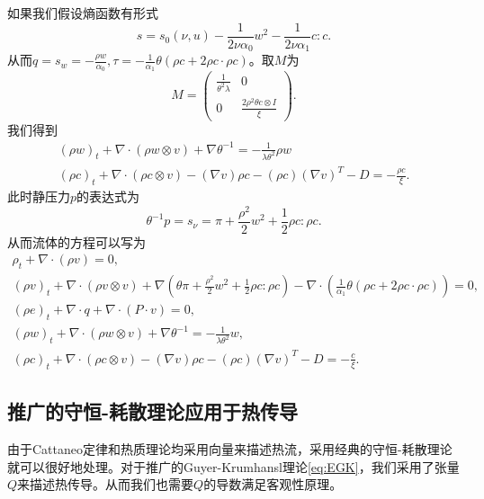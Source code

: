 \documentclass{article}
\begin{document}
	如果我们假设熵函数有形式
	\begin{equation*}
			s = s_0(\nu,u)  - \frac{1}{2 \nu \alpha_0} w^2 - \frac{1}{2  \nu \alpha_1} c:c.
	\end{equation*}
	从而$q=s_w=-\frac{\rho w}{\alpha_0},\tau = - \frac{1}{\alpha_1}  \theta (\rho c + 2 \rho c \cdot \rho c)$。取$M$为
	\begin{equation*}
		M = \left( \begin{array}{ccc} 
			\frac{1}{\theta^2 \lambda} & 0 \\
			0 &  \frac{2 \rho^2 \theta c \otimes I}{\xi}   
		\end{array} \right).
	\end{equation*}
	我们得到
\begin{eqnarray*}
			(\rho w)_t +  \nabla \cdot (\rho w \otimes v)  + \nabla \theta^{-1} = -\frac{1}{\lambda \theta^2}  \rho w \\
			(\rho c)_t +  \nabla \cdot (\rho c \otimes v) - (\nabla v) \rho c - (\rho c) (\nabla v)^T - D = - \frac{\rho c}{\xi} .
\end{eqnarray*}
此时静压力$p$的表达式为
\begin{equation*}
			\theta^{-1} p = s_\nu = \pi +\frac{\rho^2}{2} w^2 + \frac{1}{2} \rho c: \rho c.
\end{equation*}
从而流体的方程可以写为
\begin{subequations}
		\begin{align*}
			\rho_t + \nabla \cdot (\rho v) = 0 ,\\
			(\rho v)_t + \nabla \cdot (\rho v \otimes v) + \nabla (\theta\pi +\frac{\rho^2}{2} w^2 + \frac{1}{2} \rho c: \rho c)  - \nabla \cdot ( \frac{1}{\alpha_1}  \theta (\rho c + 2 \rho c \cdot \rho c)) =0 ,\\
			(\rho e)_t + \nabla \cdot q + \nabla \cdot (P \cdot v) = 0, \\
			(\rho w)_t + \nabla \cdot (\rho w \otimes v) + \nabla \theta^{-1} = -\frac{1}{\lambda \theta^2} w, \\
			(\rho c)_t +  \nabla \cdot (\rho c \otimes v) - (\nabla v) \rho c - (\rho c) (\nabla v)^T - D = - \frac{c}{\xi} .
		\end{align*}
	\end{subequations}


	\subsection{推广的守恒-耗散理论应用于热传导}
	由于Cattaneo定律和热质理论均采用向量来描述热流，采用经典的守恒-耗散理论就可以很好地处理。对于推广的Guyer-Krumhansl理论\eqref{eq:EGK}，我们采用了张量$Q$来描述热传导。从而我们也需要$Q$的导数满足客观性原理。
\end{document}
